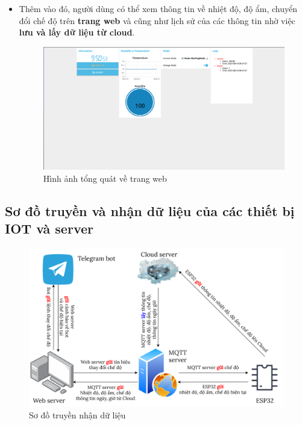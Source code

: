 \documentclass{report}
\begin{document}
\begin{itemize}
    \item Thêm vào đó, người dùng có thể xem thông tin về nhiệt độ, độ ẩm, chuyển đổi chế độ trên \textbf{trang web} và cũng như lịch sử của các thông tin nhờ việc \textbf{lưu và lấy dữ liệu từ cloud}.
    
    \begin{figure}[H]
        \includegraphics[width=\textwidth, keepaspectratio]{img/web_UI.png}
        \centering
        \caption{Hình ảnh tổng quát về trang web}
    \end{figure}
\end{itemize}


\subsection{Sơ đồ truyền và nhận dữ liệu của các thiết bị IOT và server}
\begin{figure}[!h]
    \centering
    \includegraphics[width=\textwidth, height=0.4\textheight, keepaspectratio]{img/Diagram.png}
    \caption{Sơ đồ  truyền nhận dữ liệu}
\end{figure}
\end{document}
